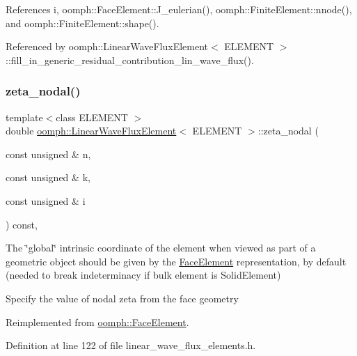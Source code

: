References i, oomph\+::\+Face\+Element\+::\+J\+\_\+eulerian(), oomph\+::\+Finite\+Element\+::nnode(), and oomph\+::\+Finite\+Element\+::shape().



Referenced by oomph\+::\+Linear\+Wave\+Flux\+Element$<$ E\+L\+E\+M\+E\+N\+T $>$\+::fill\+\_\+in\+\_\+generic\+\_\+residual\+\_\+contribution\+\_\+lin\+\_\+wave\+\_\+flux().

\mbox{\label{classoomph_1_1LinearWaveFluxElement_a6fb1a0846c91406e86f598c8eb0fafb2}} 
\subsubsection{\texorpdfstring{zeta\+\_\+nodal()}{zeta\_nodal()}}
{\footnotesize\ttfamily template$<$class E\+L\+E\+M\+E\+NT $>$ \\
double \hyperlink{classoomph_1_1LinearWaveFluxElement}{oomph\+::\+Linear\+Wave\+Flux\+Element}$<$ E\+L\+E\+M\+E\+NT $>$\+::zeta\+\_\+nodal (\begin{DoxyParamCaption}\item[{const unsigned \&}]{n,  }\item[{const unsigned \&}]{k,  }\item[{const unsigned \&}]{i }\end{DoxyParamCaption}) const\hspace{0.3cm}{\ttfamily [inline]}, {\ttfamily [virtual]}}



The \char`\"{}global\char`\"{} intrinsic coordinate of the element when viewed as part of a geometric object should be given by the \hyperlink{classoomph_1_1FaceElement}{Face\+Element} representation, by default (needed to break indeterminacy if bulk element is Solid\+Element) 

Specify the value of nodal zeta from the face geometry 

Reimplemented from \hyperlink{classoomph_1_1FaceElement_a58c9f93705c7741f76c8487d152e68a6}{oomph\+::\+Face\+Element}.



Definition at line 122 of file linear\+\_\+wave\+\_\+flux\+\_\+elements.\+h.



